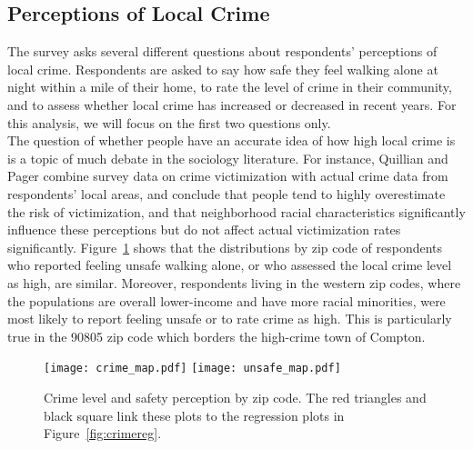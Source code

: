 \subsection{Perceptions of Local Crime}

The survey asks several different questions about respondents' perceptions of local crime.  Respondents are asked to say how safe they feel walking alone at night within a mile of their home, to rate the level of crime in their community, and to assess whether local crime has increased or decreased in recent years.  For this analysis, we will focus on the first two questions only.  \\
\indent
The question of whether people have an accurate idea of how high local crime is is a topic of much debate in the sociology literature.  For instance, Quillian and Pager \citeyearpar[pp. 79]{Quil10} combine survey data on crime victimization with actual crime data from respondents' local areas, and conclude that people tend to highly overestimate the risk of victimization, and that neighborhood racial characteristics significantly influence these perceptions but do not affect actual victimization rates significantly. Figure~\ref{fig:crimemap} shows that the distributions by zip code of respondents who reported feeling unsafe walking alone, or who assessed the local crime level as high, are similar. Moreover, respondents living in the western zip codes, where the populations are overall lower-income and have more racial minorities, were most likely to report feeling unsafe or to rate crime as high.  This is particularly true in the 90805 zip code which borders the high-crime town of Compton.

\begin{figure}
\centering
\texttt{[image: crime\_map.pdf]}
\texttt{[image: unsafe\_map.pdf]}
\caption{Crime level and safety perception by zip code.  The red triangles and black square link these plots to the regression plots in Figure~\ref{fig:crimereg}.}
\label{fig:crimemap}    
\end{figure}

